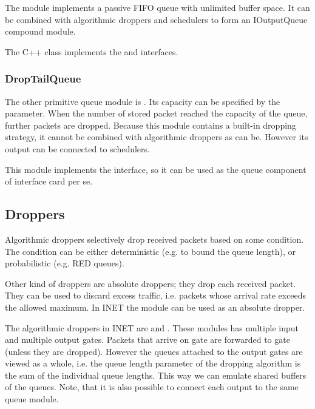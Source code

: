 The  module implements a passive
FIFO queue with unlimited buffer space. It can be combined
with algorithmic droppers and schedulers to form an
IOutputQueue compound module.

The C++ class implements the  and
 interfaces.

\subsubsection{DropTailQueue}
\label{sec:diffserv:droptailqueue}

The other primitive queue module is .
Its capacity can be specified by the 
parameter. When the number of stored packet reached the capacity
of the queue, further packets are dropped.
Because this module contains a built-in dropping strategy, it
cannot be combined with algorithmic droppers as 
can be. However its output can be connected to schedulers.

This module implements the  interface,
so it can be used as the queue component of interface card per se.

\subsection{Droppers}
\label{sec:diffserv:droppers}

Algorithmic droppers selectively drop received packets based on some condition.
The condition can be either deterministic (e.g. to bound the queue length),
or probabilistic (e.g. RED queues).

Other kind of droppers are absolute droppers; they drop each received
packet. They can be used to discard excess traffic, i.e. packets whose
arrival rate exceeds the allowed maximum. In INET the 
module can be used as an absolute dropper.

The algorithmic droppers in INET are  and
. These modules has multiple input and multiple
output gates. Packets that arrive on gate  are forwarded
to gate  (unless they are dropped). However the queues
attached to the output gates are viewed as a whole, i.e. the queue
length parameter of the dropping algorithm is the sum of the individual
queue lengths. This way we can emulate shared buffers of the queues.
Note, that it is also possible to connect each output to the same
queue module.

